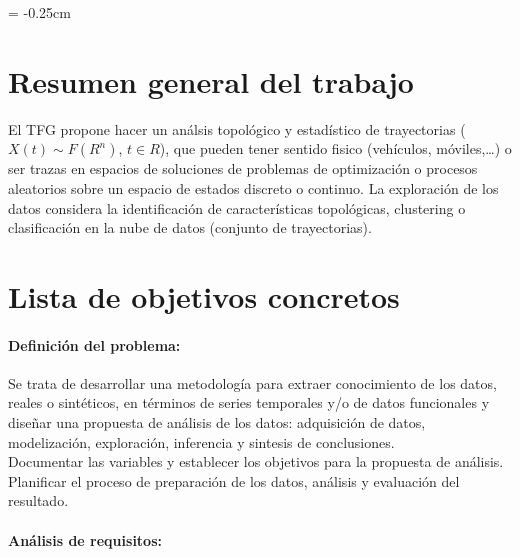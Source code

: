 \textheight        25cm
\textwidth         17.5cm
\evensidemargin    -0.25cm
\oddsidemargin =   -0.25cm
\topmargin         -3.0cm


\section{Resumen general del trabajo}

El TFG propone hacer un análsis topológico y estadístico de trayectorias ($X(t) \sim F(R^n)$, $t \in R$), que pueden tener sentido fisico (vehículos, m\'oviles,\ldots) o ser trazas en espacios de soluciones de problemas de optimización o procesos aleatorios sobre un espacio de estados discreto o continuo.
La exploración de los datos considera la identificación de características topológicas, clustering o clasificación en la nube de datos (conjunto de trayectorias).


\section{Lista de objetivos concretos}

\paragraph{Definición del problema:}

Se trata de desarrollar una metodología para extraer conocimiento de los datos, reales o sintéticos,
en términos de series temporales y/o de datos funcionales y
diseñar una propuesta de análisis de los datos:
adquisición de datos, modelización, exploración, inferencia y sintesis de conclusiones.\\

Documentar las variables y
establecer los objetivos para la propuesta de análisis.
Planificar el proceso de preparación de los datos, análisis y evaluación del resultado.

\paragraph{Análisis de requisitos:}

